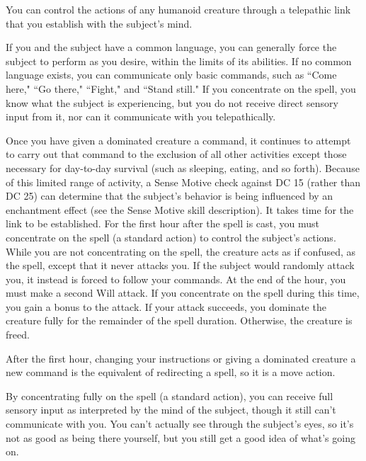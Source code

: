 \spellrng{\rngmed}
\begin{spelleffect}
  You can control the actions of any humanoid creature through a telepathic link that you establish with the subject's mind.
  \par If you and the subject have a common language, you can generally force the subject to perform as you desire, within the limits of its abilities. If no common language exists, you can communicate only basic commands, such as ``Come here," ``Go there," ``Fight," and ``Stand still." If you concentrate on the spell, you know what the subject is experiencing, but you do not receive direct sensory input from it, nor can it communicate with you telepathically.
  \par Once you have given a dominated creature a command, it continues to attempt to carry out that command to the exclusion of all other activities except those necessary for day-to-day survival (such as sleeping, eating, and so forth). Because of this limited range of activity, a Sense Motive check against DC 15 (rather than DC 25) can determine that the subject's behavior is being influenced by an enchantment effect (see the Sense Motive skill description).
  It takes time for the link to be established. For the first hour after the spell is cast, you must concentrate on the spell (a standard action) to control the subject's actions. While you are not concentrating on the spell, the creature acts as if confused, as the  spell, except that it never attacks you. If the subject would randomly attack you, it instead is forced to follow your commands. At the end of the hour, you must make a second Will attack. If you concentrate on the spell during this time, you gain a  bonus to the attack. If your attack succeeds, you dominate the creature fully for the remainder of the spell duration. Otherwise, the creature is freed.
  \par After the first hour, changing your instructions or giving a dominated creature a new command is the equivalent of redirecting a spell, so it is a move action.
  \par By concentrating fully on the spell (a standard action), you can receive full sensory input as interpreted by the mind of the subject, though it still can't communicate with you. You can't actually see through the subject's eyes, so it's not as good as being there yourself, but you still get a good idea of what's going on.

\end{spelleffect}

